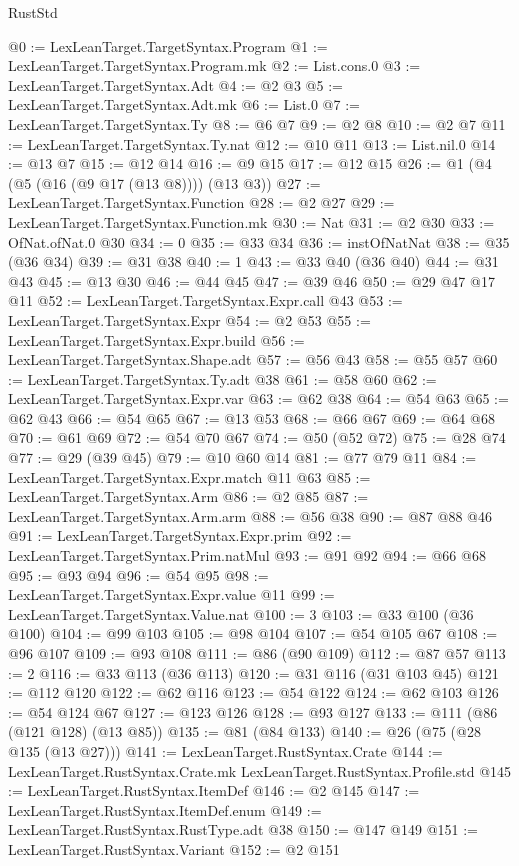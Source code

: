\begin{lexlean}{RustStd}
\begin{coremodule}
@0 := LexLeanTarget.TargetSyntax.Program
@1 := LexLeanTarget.TargetSyntax.Program.mk
@2 := List.cons.{0}
@3 := LexLeanTarget.TargetSyntax.Adt
@4 := @2 @3
@5 := LexLeanTarget.TargetSyntax.Adt.mk
@6 := List.{0}
@7 := LexLeanTarget.TargetSyntax.Ty
@8 := @6 @7
@9 := @2 @8
@10 := @2 @7
@11 := LexLeanTarget.TargetSyntax.Ty.nat
@12 := @10 @11
@13 := List.nil.{0}
@14 := @13 @7
@15 := @12 @14
@16 := @9 @15
@17 := @12 @15
@26 := @1 (@4 (@5 (@16 (@9 @17 (@13 @8)))) (@13 @3))
@27 := LexLeanTarget.TargetSyntax.Function
@28 := @2 @27
@29 := LexLeanTarget.TargetSyntax.Function.mk
@30 := Nat
@31 := @2 @30
@33 := OfNat.ofNat.{0} @30
@34 := 0
@35 := @33 @34
@36 := instOfNatNat
@38 := @35 (@36 @34)
@39 := @31 @38
@40 := 1
@43 := @33 @40 (@36 @40)
@44 := @31 @43
@45 := @13 @30
@46 := @44 @45
@47 := @39 @46
@50 := @29 @47 @17 @11
@52 := LexLeanTarget.TargetSyntax.Expr.call @43
@53 := LexLeanTarget.TargetSyntax.Expr
@54 := @2 @53
@55 := LexLeanTarget.TargetSyntax.Expr.build
@56 := LexLeanTarget.TargetSyntax.Shape.adt
@57 := @56 @43
@58 := @55 @57
@60 := LexLeanTarget.TargetSyntax.Ty.adt @38
@61 := @58 @60
@62 := LexLeanTarget.TargetSyntax.Expr.var
@63 := @62 @38
@64 := @54 @63
@65 := @62 @43
@66 := @54 @65
@67 := @13 @53
@68 := @66 @67
@69 := @64 @68
@70 := @61 @69
@72 := @54 @70 @67
@74 := @50 (@52 @72)
@75 := @28 @74
@77 := @29 (@39 @45)
@79 := @10 @60 @14
@81 := @77 @79 @11
@84 := LexLeanTarget.TargetSyntax.Expr.match @11 @63
@85 := LexLeanTarget.TargetSyntax.Arm
@86 := @2 @85
@87 := LexLeanTarget.TargetSyntax.Arm.arm
@88 := @56 @38
@90 := @87 @88 @46
@91 := LexLeanTarget.TargetSyntax.Expr.prim
@92 := LexLeanTarget.TargetSyntax.Prim.natMul
@93 := @91 @92
@94 := @66 @68
@95 := @93 @94
@96 := @54 @95
@98 := LexLeanTarget.TargetSyntax.Expr.value @11
@99 := LexLeanTarget.TargetSyntax.Value.nat
@100 := 3
@103 := @33 @100 (@36 @100)
@104 := @99 @103
@105 := @98 @104
@107 := @54 @105 @67
@108 := @96 @107
@109 := @93 @108
@111 := @86 (@90 @109)
@112 := @87 @57
@113 := 2
@116 := @33 @113 (@36 @113)
@120 := @31 @116 (@31 @103 @45)
@121 := @112 @120
@122 := @62 @116
@123 := @54 @122
@124 := @62 @103
@126 := @54 @124 @67
@127 := @123 @126
@128 := @93 @127
@133 := @111 (@86 (@121 @128) (@13 @85))
@135 := @81 (@84 @133)
@140 := @26 (@75 (@28 @135 (@13 @27)))
@141 := LexLeanTarget.RustSyntax.Crate
@144 := LexLeanTarget.RustSyntax.Crate.mk LexLeanTarget.RustSyntax.Profile.std
@145 := LexLeanTarget.RustSyntax.ItemDef
@146 := @2 @145
@147 := LexLeanTarget.RustSyntax.ItemDef.enum
@149 := LexLeanTarget.RustSyntax.RustType.adt @38
@150 := @147 @149
@151 := LexLeanTarget.RustSyntax.Variant
@152 := @2 @151

\end{coremodule}
\end{lexlean}
